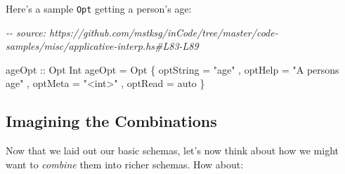 \documentclass[]{article}
\newenvironment{Shaded}{}{}
\newcommand{\CommentTok}[1]{\textcolor[rgb]{0.38,0.63,0.69}{\textit{#1}}}
\newcommand{\DataTypeTok}[1]{\textcolor[rgb]{0.56,0.13,0.00}{#1}}
\newcommand{\DecValTok}[1]{\textcolor[rgb]{0.25,0.63,0.44}{#1}}
\newcommand{\NormalTok}[1]{#1}
\newcommand{\OperatorTok}[1]{\textcolor[rgb]{0.40,0.40,0.40}{#1}}
\newcommand{\OtherTok}[1]{\textcolor[rgb]{0.00,0.44,0.13}{#1}}
\newcommand{\StringTok}[1]{\textcolor[rgb]{0.25,0.44,0.63}{#1}}
\begin{document}
Here's a sample \texttt{Opt} getting a person's age:

\begin{Shaded}
\begin{Highlighting}[]
\CommentTok{{-}{-} source: https://github.com/mstksg/inCode/tree/master/code{-}samples/misc/applicative{-}interp.hs\#L83{-}L89}

\OtherTok{ageOpt ::} \DataTypeTok{Opt} \DataTypeTok{Int}
\NormalTok{ageOpt }\OtherTok{=} \DataTypeTok{Opt}
\NormalTok{    \{ optString }\OtherTok{=} \StringTok{"age"}
\NormalTok{    , optHelp   }\OtherTok{=} \StringTok{"A person\textquotesingle{}s age"}
\NormalTok{    , optMeta   }\OtherTok{=} \StringTok{"\textless{}int\textgreater{}"}
\NormalTok{    , optRead   }\OtherTok{=}\NormalTok{ auto}
\NormalTok{    \}}
\end{Highlighting}
\end{Shaded}

\begin{Shaded}
\end{Shaded}

\subsection{Imagining the Combinations}\label{imagining-the-combinations}

Now that we laid out our basic schemas, let's now think about how we might want
to \emph{combine} them into richer schemas. How about:
\end{document}
